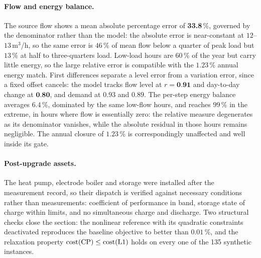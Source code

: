 \paragraph{Flow and energy balance.}
The source flow shows a mean absolute percentage error of \textbf{33.8}\,\%, governed by the
denominator rather than the model: the absolute error is near-constant at $12$--$13$\,m$^3$/h,
so the same error is $46$\,\% of mean flow below a quarter of peak load but $13$\,\% at half to
three-quarters load. Low-load hours are $60$\,\% of the year but carry little energy, so the
large relative error is compatible with the $1.23$\,\% annual energy match. First differences
separate a level error from a variation error, since a fixed offset cancels: the model tracks
flow level at $r=\textbf{0.91}$ and day-to-day change at $\textbf{0.80}$, and demand at $0.93$
and $0.89$. The per-step energy balance averages $6.4$\,\%, dominated by the same low-flow
hours, and reaches $99$\,\% in the extreme, in hours where flow is essentially zero: the
relative measure degenerates as its denominator vanishes, while the absolute residual in those
hours remains negligible. The annual closure of $1.23$\,\% is correspondingly unaffected and
well inside its gate.

\paragraph{Post-upgrade assets.}
The heat pump, electrode boiler and storage were installed after the measurement record, so
their dispatch is verified against necessary conditions rather than measurements: coefficient
of performance in band, storage state of charge within limits, and no simultaneous charge and
discharge. Two structural checks close the section: the nonlinear reference with its quadratic
constraints deactivated reproduces the baseline objective to better than $0.01$\,\%, and the
relaxation property $\mathrm{cost}(\mathrm{CP}) \le \mathrm{cost}(\mathrm{L1})$ holds on every one of the 135
synthetic instances.